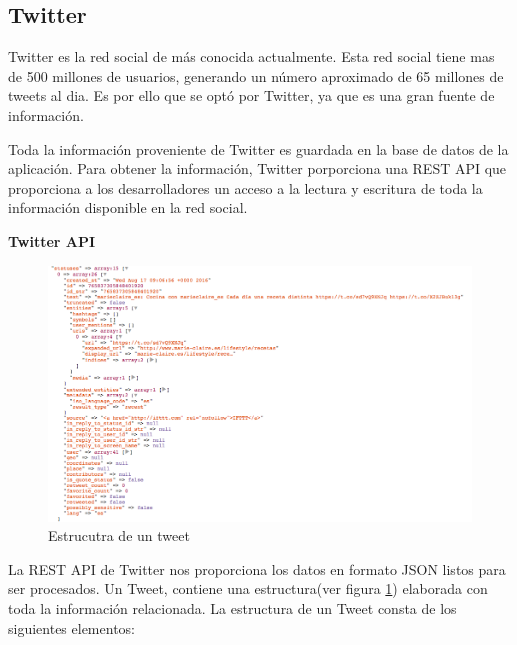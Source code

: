 \subsection{Twitter}

Twitter es la red social de  más conocida actualmente. Esta red social tiene mas de 500 millones de usuarios, generando un número aproximado de 65 millones de tweets al dia. Es por ello que se optó por Twitter, ya que es una gran fuente de información.

\vspace{5 mm}

Toda la información proveniente de Twitter es guardada en la base de datos de la aplicación. Para obtener la información, Twitter porporciona una REST API que proporciona a los desarrolladores un acceso a la lectura y escritura de toda la información disponible en la red social.

\vspace{5 mm}

\textbf{Twitter API}

\vspace{5 mm}

\begin{figure}
\begin{center}
\includegraphics[width=1.0\textwidth]{imagenes/estructura-tweet.png}
\caption{Estrucutra de un tweet}
\label{tweet}
\end{center}
\end{figure}

La REST API de Twitter nos proporciona los datos en formato JSON listos para ser procesados. Un Tweet, contiene una estructura(ver figura \ref{tweet}) elaborada con toda la información relacionada. La estructura de un Tweet consta de los siguientes elementos:

